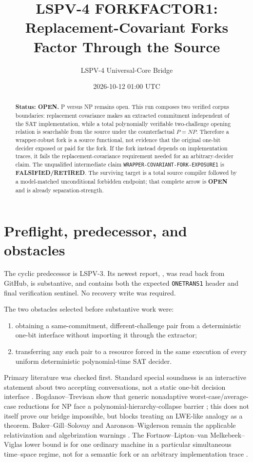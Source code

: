 \documentclass[11pt]{article}
\title{LSPV-4 FORKFACTOR1: Replacement-Covariant Forks Factor Through the Source}
\author{LSPV-4 Universal-Core Bridge}
\date{2026-10-12 01:00 UTC}
\newcommand{\OPEN}{\textbf{OPEN}}
\newcommand{\RETIRED}{\textbf{FALSIFIED/RETIRED}}
\begin{document}
\maketitle

\begin{abstract}
\textbf{Status: OPEN.} P versus NP remains open.  This run composes two
verified corpus boundaries: replacement covariance makes an extracted
commitment independent of the SAT implementation, while a total
polynomially verifiable two-challenge opening relation is searchable from the
source under the counterfactual $P=NP$.  Therefore a wrapper-robust fork is a
source functional, not evidence that the original one-bit decider exposed or
paid for the fork.  If the fork instead depends on implementation traces, it
fails the replacement-covariance requirement needed for an arbitrary-decider
claim.  The unqualified intermediate claim
\texttt{WRAPPER-COVARIANT-FORK-EXPOSURE1} is \RETIRED.  The surviving target
is a total source compiler followed by a model-matched unconditional
forbidden endpoint; that complete arrow is \OPEN{} and is already
separation-strength.
\end{abstract}

\section{Preflight, predecessor, and obstacles}

The cyclic predecessor is LSPV-3.  Its newest report,
, was read
back from GitHub, is substantive, and contains both the expected
\texttt{ONETRANS1} header and final verification sentinel.  No recovery write
was required.

The two obstacles selected before substantive work were:
\begin{enumerate}[leftmargin=1.7em]
\item obtaining a same-commitment, different-challenge pair from a
deterministic one-bit interface without importing it through the extractor;
\item transferring any such pair to a resource forced in the same execution
of every uniform deterministic polynomial-time SAT decider.
\end{enumerate}
Primary literature was checked first.  Standard special soundness is an
interactive statement about two accepting conversations, not a static
one-bit decision interface \cite{Damgaard10}.  Bogdanov--Trevisan show that
generic nonadaptive worst-case/average-case reductions for NP face a
polynomial-hierarchy-collapse barrier \cite{BT06}; this does not itself prove
our bridge impossible, but blocks treating an LWE-like analogy as a theorem.
Baker--Gill--Solovay and Aaronson--Wigderson remain the applicable
relativization and algebrization warnings \cite{BGS75,AW09}.  The
Fortnow--Lipton--van Melkebeek--Viglas lower bound is for one ordinary machine
in a particular simultaneous time--space regime, not for a semantic fork or
an arbitrary implementation trace \cite{FLMV05}.
\end{document}
